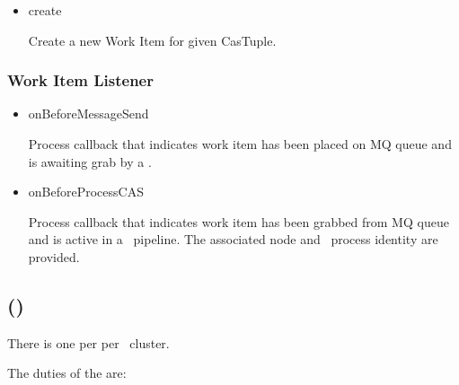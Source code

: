 \begin{itemize}
    \begin{itemize}
    
      \item create
      
      Create a new Work Item for given CasTuple.
      
    \end{itemize}  
          
    \subsubsection{Work Item Listener}
    
    \begin{itemize}
    
      \item onBeforeMessageSend
      
      Process callback that indicates work item has been placed on MQ queue and
      is awaiting grab by a \varJP.
      
      \item onBeforeProcessCAS
            
      Process callback that indicates work item has been grabbed from MQ queue and
      is active in a \varUIMA~pipeline.
      The associated node and \varLinux~process identity are provided.
      
    \end{itemize}
    
    \subsection{\varWebServer (\varWS)}    
    
    There is one \varWebServer per \varNodeMachineComputer per \varDUCC~cluster.
    
    The duties of the \varWebServer are:
    

\end{itemize}
